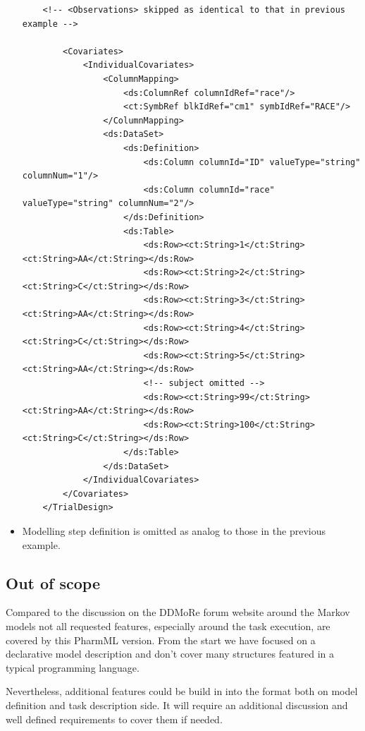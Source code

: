 \begin{itemize}
\begin{lstlisting}
	<!-- <Observations> skipped as identical to that in previous example -->
        
        <Covariates>
            <IndividualCovariates>
                <ColumnMapping>
                    <ds:ColumnRef columnIdRef="race"/>
                    <ct:SymbRef blkIdRef="cm1" symbIdRef="RACE"/>
                </ColumnMapping>
                <ds:DataSet>
                    <ds:Definition>
                        <ds:Column columnId="ID" valueType="string" columnNum="1"/>
                        <ds:Column columnId="race" valueType="string" columnNum="2"/>
                    </ds:Definition>
                    <ds:Table>
                        <ds:Row><ct:String>1</ct:String><ct:String>AA</ct:String></ds:Row>
                        <ds:Row><ct:String>2</ct:String><ct:String>C</ct:String></ds:Row>
                        <ds:Row><ct:String>3</ct:String><ct:String>AA</ct:String></ds:Row>
                        <ds:Row><ct:String>4</ct:String><ct:String>C</ct:String></ds:Row>
                        <ds:Row><ct:String>5</ct:String><ct:String>AA</ct:String></ds:Row>
                        <!-- subject omitted -->
                        <ds:Row><ct:String>99</ct:String><ct:String>AA</ct:String></ds:Row>
                        <ds:Row><ct:String>100</ct:String><ct:String>C</ct:String></ds:Row>
                    </ds:Table>
                </ds:DataSet>
            </IndividualCovariates>
        </Covariates>
    </TrialDesign>
\end{lstlisting}
\item
Modelling step definition is omitted as analog to those in the previous example.
\end{itemize}


\subsection{Out of scope}
Compared to the discussion on the DDMoRe forum website around the Markov models
not all requested features, especially around the task execution, are covered by this
PharmML version. 
From the start we have focused on a declarative model description and
don't cover many structures featured in a typical programming language.

Nevertheless, additional features could be build in into the format both on 
model definition and task description side. It will require an additional discussion 
and well defined requirements to cover them if needed.


